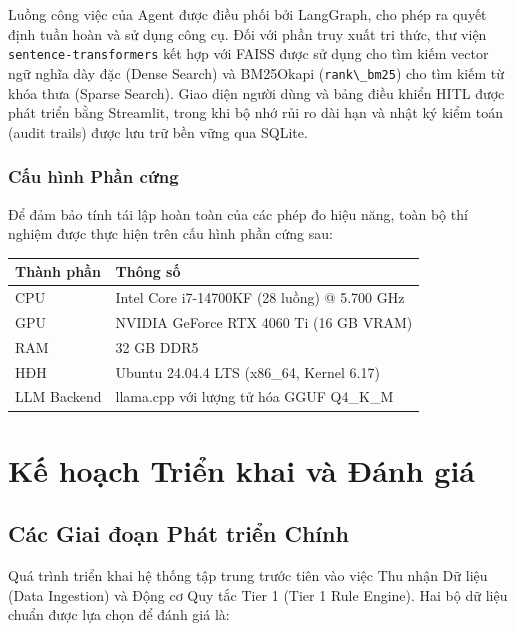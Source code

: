\documentclass[12pt,a4paper]{article}
\begin{document}
Luồng công việc của Agent được điều phối bởi LangGraph, cho phép ra quyết định tuần hoàn và sử dụng công cụ. Đối với phần truy xuất tri thức, thư viện \verb|sentence-transformers| kết hợp với FAISS được sử dụng cho tìm kiếm vector ngữ nghĩa dày đặc (Dense Search) và BM25Okapi (\verb|rank\_bm25|) cho tìm kiếm từ khóa thưa (Sparse Search). Giao diện người dùng và bảng điều khiển HITL được phát triển bằng Streamlit, trong khi bộ nhớ rủi ro dài hạn và nhật ký kiểm toán (audit trails) được lưu trữ bền vững qua SQLite.

\subsubsection{Cấu hình Phần cứng}
Để đảm bảo tính tái lập hoàn toàn của các phép đo hiệu năng, toàn bộ thí nghiệm được thực hiện trên cấu hình phần cứng sau:

\begin{table}[H]
    \centering
    \begin{tabular}{ll}
        \toprule
        \textbf{Thành phần} & \textbf{Thông số}                            \\
        \midrule
        CPU                 & Intel Core i7-14700KF (28 luồng) @ 5.700 GHz \\
        GPU                 & NVIDIA GeForce RTX 4060 Ti (16 GB VRAM)      \\
        RAM                 & 32 GB DDR5                                   \\
        HĐH                 & Ubuntu 24.04.4 LTS (x86\_64, Kernel 6.17)    \\
        LLM Backend         & llama.cpp với lượng tử hóa GGUF Q4\_K\_M     \\
        \bottomrule
    \end{tabular}
\end{table}

\newpage
\section{Kế hoạch Triển khai và Đánh giá}

\subsection{Các Giai đoạn Phát triển Chính}
Quá trình triển khai hệ thống tập trung trước tiên vào việc Thu nhận Dữ liệu (Data Ingestion) và Động cơ Quy tắc Tier 1 (Tier 1 Rule Engine). Hai bộ dữ liệu chuẩn được lựa chọn để đánh giá là:
\end{document}

